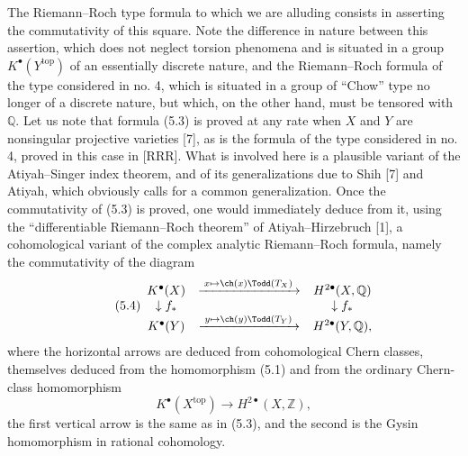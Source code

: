 The Riemann--Roch type formula to which we are alluding consists in asserting the commutativity of this square. Note the difference in nature between this assertion, which does not neglect torsion phenomena and is situated in a group $K^\bullet(Y^{\mathrm{top}})$ of an essentially discrete nature, and the Riemann--Roch formula of the type considered in no. 4, which is situated in a group of ``Chow'' type no longer of a discrete nature, but which, on the other hand, must be tensored with $\mathbb Q$. Let us note that formula (5.3) is proved at any rate when $X$ and $Y$ are nonsingular projective varieties [7], as is the formula of the type considered in no. 4, proved in this case in [RRR]. What is involved here is a plausible variant of the Atiyah--Singer index theorem, and of its generalizations due to Shih [7] and Atiyah, which obviously calls for a common generalization. Once the commutativity of (5.3) is proved, one would immediately deduce from it, using the ``differentiable Riemann--Roch theorem'' of Atiyah--Hirzebruch [1], a cohomological variant of the complex analytic Riemann--Roch formula, namely the commutativity of the diagram
\begin{equation}\tag{5.4}
\begin{array}{ccc}
K^\bullet(X) & \xrightarrow{\;x\mapsto \ch(x)\Todd(T_X)\;} & H^{2\bullet}(X,\mathbb Q) \\
\downarrow f_* && \downarrow f_* \\
K^\bullet(Y) & \xrightarrow{\;y\mapsto \ch(y)\Todd(T_Y)\;} & H^{2\bullet}(Y,\mathbb Q),
\end{array}
\end{equation}
where the horizontal arrows are deduced from cohomological Chern classes, themselves deduced from the homomorphism (5.1) and from the ordinary Chern-class homomorphism
\[
K^\bullet(X^{\mathrm{top}})\longrightarrow H^{2\bullet}(X,\mathbb Z),
\]
the first vertical arrow is the same as in (5.3), and the second is the Gysin homomorphism in rational cohomology.

